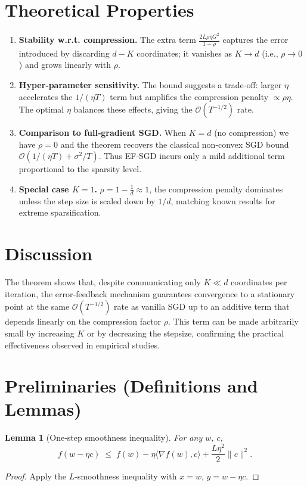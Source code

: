 \documentclass{article}
\newtheorem{lemma}{Lemma}
\begin{document}
\section*{Theoretical Properties}
\begin{enumerate}[label=\arabic*.]
\item \textbf{Stability w.r.t. compression.}  The extra term $\frac{2L\rho\eta G^{2}}{1-\rho}$ captures the error introduced by discarding $d-K$ coordinates; it vanishes as $K\!\to\! d$ (i.e., $\rho\to0$) and grows linearly with $\rho$.
\item \textbf{Hyper‑parameter sensitivity.}  The bound suggests a trade‑off: larger $\eta$ accelerates the $1/(\eta T)$ term but amplifies the compression penalty $\propto\rho\eta$.  The optimal $\eta$ balances these effects, giving the $\mathcal O(T^{-1/2})$ rate.
\item \textbf{Comparison to full‑gradient SGD.}  When $K=d$ (no compression) we have $\rho=0$ and the theorem recovers the classical non‑convex SGD bound $\mathcal O(1/(\eta T)+\sigma^{2}/T)$.  Thus EF‑SGD incurs only a mild additional term proportional to the sparsity level.
\item \textbf{Special case $K=1$.}  $\rho=1-\frac1d\approx1$, the compression penalty dominates unless the step size is scaled down by $1/d$, matching known results for extreme sparsification.
\end{enumerate}

\section*{Discussion}
The theorem shows that, despite communicating only $K\ll d$ coordinates per iteration, the error‑feedback mechanism guarantees convergence to a stationary point at the same $\mathcal O(T^{-1/2})$ rate as vanilla SGD up to an additive term that depends linearly on the compression factor $\rho$.  This term can be made arbitrarily small by increasing $K$ or by decreasing the stepsize, confirming the practical effectiveness observed in empirical studies.

\section*{Preliminaries (Definitions and Lemmas)}
\begin{lemma}[One‑step smoothness inequality]\label{lem:smooth}
For any $w$, $c$,
\[
f(w-\eta c)\;\le\; f(w)-\eta\langle\nabla f(w),c\rangle+\frac{L\eta^{2}}{2}\|c\|^{2}.
\]
\end{lemma}
\begin{proof}
Apply the $L$‑smoothness inequality with $x=w$, $y=w-\eta c$.
\end{proof}
\end{document}
